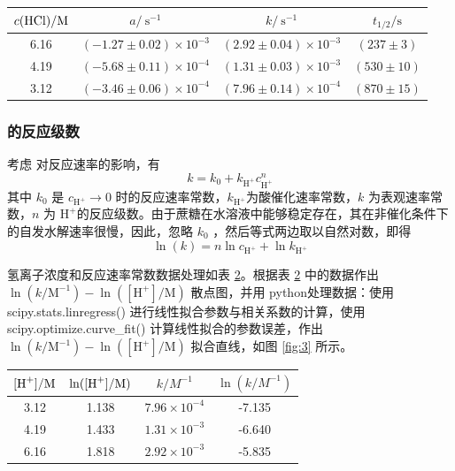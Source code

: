 \begin{table}[htbp]
    \centering
    \begin{tabular}{cccc}
    \toprule
         $c(\ce{HCl}) / \mathrm{M}$ & $a /\mathrm{~s}^{-1}$ & $k /\mathrm{~s}^{-1}$ & $t_{1 / 2} / \mathrm{s}$\\
         \midrule
        6.16 & $(-1.27 \pm 0.02) \times 10^{-3}$ & $(2.92 \pm 0.04) \times 10^{-3}$ & $(237 \pm 3) $ \\
        4.19 & $(-5.68 \pm 0.11) \times 10^{-4}$ & $(1.31 \pm 0.03) \times 10^{-3}$ & $(530 \pm 10) $ \\
        3.12 & $(-3.46 \pm 0.06) \times 10^{-4}$ & $(7.96 \pm 0.14) \times 10^{-4}$ & $(870 \pm 15) $ \\
    \bottomrule
    \end{tabular}
    \label{tab:5}
\end{table}

\subsubsection{ 的反应级数}

考虑  对反应速率的影响，有
$$
k=k_0+k_{\mathrm{H}^{+}} c_{\mathrm{H}^{+}}^n
$$
其中 $k_0$ 是 $c_{\mathrm{H}^{+}} \rightarrow 0$ 时的反应速率常数，$k_{\mathrm{H}^{+}}$为酸催化速率常数，$k$ 为表观速率常数，$n$ 为 $\mathrm{H}^{+}$的反应级数。由于蔗糖在水溶液中能够稳定存在，其在非催化条件下的自发水解速率很慢，因此，忽略 $k_0$ ，然后等式两边取以自然对数，即得
$$
\ln \left(k\right)=n \ln c_{\mathrm{H}^{+}}+\ln k_{\mathrm{H}^{+}}
$$

氢离子浓度和反应速率常数数据处理如表 \ref{tab:6}。根据表 \ref{tab:6} 中的数据作出 $\ln\left(k/\mathrm{M}^{-1}\right)-\ln\left([\mathrm{H}^+]/\mathrm{M}\right)$ 散点图，并用 python处理数据：使用scipy.stats.linregress() 进行线性拟合参数与相关系数的计算，使用scipy.optimize.curve\_fit() 计算线性拟合的参数误差，作出 $\ln\left(k/\mathrm{M}^{-1}\right)-\ln\left([\mathrm{H}^+]/\mathrm{M}\right)$  拟合直线，如图 \ref{fig:3} 所示。

\begin{table}[H]
    \centering
    \begin{tabular}{cccc}
    \toprule
        $[\ce{H+}] / \si{M}$ & $\ln ([\ce{H+}] / \si{M})$ & $k/\si{M^{-1}}$ & $\ln (k/\si{M^{-1}})$ \\
        \midrule
        3.12 & 1.138 & $7.96\times 10^{-4}$ & -7.135 \\
        4.19 & 1.433 & $1.31\times 10^{-3}$ & -6.640 \\
        6.16 & 1.818 & $2.92\times 10^{-3}$ & -5.835 \\
        \bottomrule
    \end{tabular}
    \label{tab:6}
\end{table}

